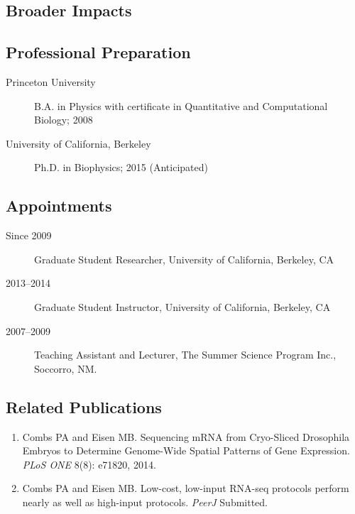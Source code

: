 \documentclass{proposal}
\def\ReferencesPage{E}
\def\BioSketchPage{F}
\begin{document}
\subsection{Broader Impacts}




\newpage
{}
\renewcommand{\thepage} {\ReferencesPage--\arabic{page}}




\newpage
{}
\renewcommand{\thepage} {\BioSketchPage--\arabic{page}}


\subsection*{Professional Preparation}
\begin{description}
\item[Princeton University] B.A. in Physics with certificate in Quantitative and Computational Biology; 2008
\item [University of California, Berkeley] Ph.D. in Biophysics; 2015 (Anticipated)

\end{description}

\subsection*{Appointments}
\begin{description}
\item[Since 2009] Graduate Student Researcher, University of California, Berkeley, CA
\item[2013--2014] Graduate Student Instructor, University of California, Berkeley, CA
\item[2007--2009] Teaching Assistant and Lecturer, The Summer Science Program Inc., Soccorro, NM.
\end{description}

\subsection*{Related Publications}
\begin{enumerate}
\item Combs PA and Eisen MB. Sequencing mRNA from Cryo-Sliced Drosophila Embryos to Determine Genome-Wide Spatial Patterns of Gene Expression. {\em PLoS ONE} 8(8): e71820, 2014.
\item Combs PA and Eisen MB. Low-cost, low-input RNA-seq protocols perform nearly as well as high-input protocols. {\em PeerJ} Submitted.
\end{enumerate}
\end{document}
